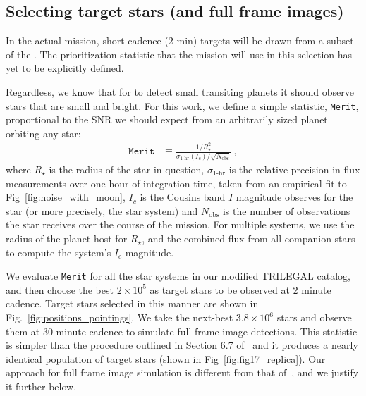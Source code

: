 \subsection{Selecting target stars (and full frame images)}
\label{sec:selection_criteria}
In the actual mission, \tesss short cadence (2 min) targets will be drawn from a subset of the \tic. 
The prioritization statistic that the mission will use in this selection has yet to be explicitly defined.

Regardless, we know that for \tess to detect small transiting planets it should observe stars that are small and bright.
For this work, we define a simple statistic, \texttt{Merit}, proportional to the SNR we should expect from an arbitrarily sized planet orbiting any star:
\begin{align}
\texttt{Merit} &\equiv 
	\frac{1/R_\star^2}{\sigma_\text{1-hr}(I_c)/\sqrt{N_\text{obs}}}\ ,
\label{eq:merit}
\end{align}
where $R_\star$ is the radius of the star in question, $\sigma_\text{1-hr}$ is the relative precision in flux measurements over one hour of integration time, taken from an empirical fit to Fig~\ref{fig:noise_with_moon}, $I_c$ is the Cousins band $I$ magnitude \tess observes for the star (or more precisely, the star system) and $N_\text{obs}$ is the number of observations the star receives over the course of the mission.
For multiple systems, we use the radius of the planet host for $R_\star$, and the combined flux from all companion stars to compute the system's $I_c$ magnitude.

We evaluate \texttt{Merit} for all the star systems in our modified TRILEGAL catalog, and then choose the best $2\times10^5$ as target stars to be observed at 2 minute cadence.
Target stars selected in this manner are shown in Fig.~\ref{fig:positions_pointings}.
We take the next-best $3.8\times10^6$ stars and observe them at 30 minute cadence to simulate full frame image detections.
This statistic is simpler than the procedure outlined in Section 6.7 of~ and it produces a nearly identical population of target stars (shown in Fig~\ref{fig:fig17_replica}).
Our approach for full frame image simulation is different from that of~, and we justify it further below.

